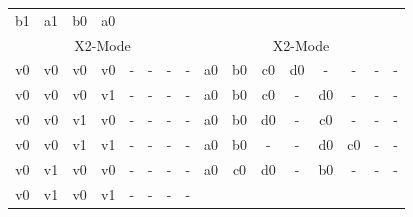 \begin{table}[H]
{\begin{minipage}{\textwidth}
\begin{tabular}{cccccccccccccccc}
		\multicolumn{1}{c}{b1} &
		\multicolumn{1}{c}{a1} &
		\multicolumn{1}{c}{b0}&
		\multicolumn{1}{c}{a0} \\		
		\multicolumn{8}{c}{X2-Mode} &   \multicolumn{8}{|c}{X2-Mode} \\
		\hline
		\multicolumn{1}{c}{v0} & \multicolumn{1}{c}{v0} & \multicolumn{1}{c}{v0} & \multicolumn{1}{c}{v0} &
		\multicolumn{1}{c}{-} & \multicolumn{1}{c}{-} & \multicolumn{1}{c}{-} & \multicolumn{1}{c}{-} &
		\multicolumn{1}{|c}{a0} & \multicolumn{1}{c}{b0} & \multicolumn{1}{c}{c0}& \multicolumn{1}{c}{d0} &
		\multicolumn{1}{c}{-} &
		\multicolumn{1}{c}{-} &
		\multicolumn{1}{c}{-}&
		\multicolumn{1}{c}{-} \\
		\multicolumn{1}{c}{v0} & \multicolumn{1}{c}{v0} & \multicolumn{1}{c}{v0} & \multicolumn{1}{c}{v1} &
		\multicolumn{1}{c}{-} & \multicolumn{1}{c}{-} & \multicolumn{1}{c}{-} & \multicolumn{1}{c}{-} &
		\multicolumn{1}{|c}{a0} & \multicolumn{1}{c}{b0} & \multicolumn{1}{c}{c0}& \multicolumn{1}{c}{-} &
		\multicolumn{1}{c}{d0} &
		\multicolumn{1}{c}{-} &
		\multicolumn{1}{c}{-}&
		\multicolumn{1}{c}{-} \\
		\multicolumn{1}{c}{v0} & \multicolumn{1}{c}{v0} & \multicolumn{1}{c}{v1} & \multicolumn{1}{c}{v0} &
		\multicolumn{1}{c}{-} & \multicolumn{1}{c}{-} & \multicolumn{1}{c}{-} & \multicolumn{1}{c}{-} &
		\multicolumn{1}{|c}{a0} & \multicolumn{1}{c}{b0} & \multicolumn{1}{c}{d0}& \multicolumn{1}{c}{-} &
		\multicolumn{1}{c}{c0} &
		\multicolumn{1}{c}{-} &
		\multicolumn{1}{c}{-}&
		\multicolumn{1}{c}{-} \\
		\multicolumn{1}{c}{v0} & \multicolumn{1}{c}{v0} & \multicolumn{1}{c}{v1} & \multicolumn{1}{c}{v1} &
		\multicolumn{1}{c}{-} & \multicolumn{1}{c}{-} & \multicolumn{1}{c}{-} & \multicolumn{1}{c}{-} &
		\multicolumn{1}{|c}{a0} & \multicolumn{1}{c}{b0} & \multicolumn{1}{c}{-}& \multicolumn{1}{c}{-} &
		\multicolumn{1}{c}{d0} &
		\multicolumn{1}{c}{c0} &
		\multicolumn{1}{c}{-}&
		\multicolumn{1}{c}{-} \\
		\multicolumn{1}{c}{v0} & \multicolumn{1}{c}{v1} & \multicolumn{1}{c}{v0} & \multicolumn{1}{c}{v0} &
		\multicolumn{1}{c}{-} & \multicolumn{1}{c}{-} & \multicolumn{1}{c}{-} & \multicolumn{1}{c}{-} &
		\multicolumn{1}{|c}{a0} & \multicolumn{1}{c}{c0} & \multicolumn{1}{c}{d0}& \multicolumn{1}{c}{-} &
		\multicolumn{1}{c}{b0} &
		\multicolumn{1}{c}{-} &
		\multicolumn{1}{c}{-}&
		\multicolumn{1}{c}{-} \\
		\multicolumn{1}{c}{v0} & \multicolumn{1}{c}{v1} & \multicolumn{1}{c}{v0} & \multicolumn{1}{c}{v1} &
		\multicolumn{1}{c}{-} & \multicolumn{1}{c}{-} & \multicolumn{1}{c}{-} & \multicolumn{1}{c}{-} &

\end{tabular}
\end{minipage}}
\end{table}
